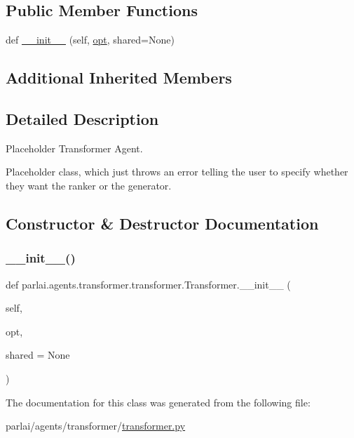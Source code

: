 \subsection*{Public Member Functions}
\begin{DoxyCompactItemize}
\item 
def \hyperlink{classparlai_1_1agents_1_1transformer_1_1transformer_1_1Transformer_ac71f8b1da727e5a62f56700fd87f3d60}{\+\_\+\+\_\+init\+\_\+\+\_\+} (self, \hyperlink{classparlai_1_1core_1_1agents_1_1Agent_ab3b45d2754244608c75d4068b90cd051}{opt}, shared=None)
\end{DoxyCompactItemize}
\subsection*{Additional Inherited Members}


\subsection{Detailed Description}
\begin{DoxyVerb}Placeholder Transformer Agent.

Placeholder class, which just throws an error telling the user to specify whether
they want the ranker or the generator.
\end{DoxyVerb}
 

\subsection{Constructor \& Destructor Documentation}
\mbox{\label{classparlai_1_1agents_1_1transformer_1_1transformer_1_1Transformer_ac71f8b1da727e5a62f56700fd87f3d60}} 
\subsubsection{\texorpdfstring{\+\_\+\+\_\+init\+\_\+\+\_\+()}{\_\_init\_\_()}}
{\footnotesize\ttfamily def parlai.\+agents.\+transformer.\+transformer.\+Transformer.\+\_\+\+\_\+init\+\_\+\+\_\+ (\begin{DoxyParamCaption}\item[{}]{self,  }\item[{}]{opt,  }\item[{}]{shared = {\ttfamily None} }\end{DoxyParamCaption})}



The documentation for this class was generated from the following file\+:\begin{DoxyCompactItemize}
\item 
parlai/agents/transformer/\hyperlink{transformer_8py}{transformer.\+py}\end{DoxyCompactItemize}
